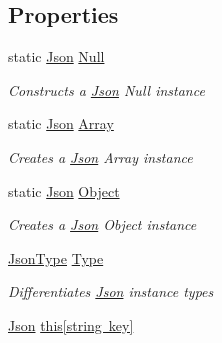 \subsection*{Properties}
\begin{DoxyCompactItemize}
\item 
static \mbox{\hyperlink{class_eagle_eye_1_1_models_1_1_json}{Json}} \mbox{\hyperlink{class_eagle_eye_1_1_models_1_1_json_a5a747d9202e52fdcfba6fd6cc821d5f0}{Null}}
\begin{DoxyCompactList}\small\item\em Constructs a \mbox{\hyperlink{class_eagle_eye_1_1_models_1_1_json}{Json}} Null instance \end{DoxyCompactList}\item 
static \mbox{\hyperlink{class_eagle_eye_1_1_models_1_1_json}{Json}} \mbox{\hyperlink{class_eagle_eye_1_1_models_1_1_json_a35e8187d23b3971fe9064b643fe66a5a}{Array}}
\begin{DoxyCompactList}\small\item\em Creates a \mbox{\hyperlink{class_eagle_eye_1_1_models_1_1_json}{Json}} Array instance \end{DoxyCompactList}\item 
static \mbox{\hyperlink{class_eagle_eye_1_1_models_1_1_json}{Json}} \mbox{\hyperlink{class_eagle_eye_1_1_models_1_1_json_a2196bd75222570b3e481efc887c28bf5}{Object}}
\begin{DoxyCompactList}\small\item\em Creates a \mbox{\hyperlink{class_eagle_eye_1_1_models_1_1_json}{Json}} Object instance \end{DoxyCompactList}\item 
\mbox{\hyperlink{class_eagle_eye_1_1_models_1_1_json_afdf0e16163f8b9bab5b45d6d01e8133c}{Json\+Type}} \mbox{\hyperlink{class_eagle_eye_1_1_models_1_1_json_a8b9b9f8ed1df50c3d00d2bd7cbbd9e46}{Type}}
\begin{DoxyCompactList}\small\item\em Differentiates \mbox{\hyperlink{class_eagle_eye_1_1_models_1_1_json}{Json}} instance types \end{DoxyCompactList}\item 
\mbox{\hyperlink{class_eagle_eye_1_1_models_1_1_json}{Json}} \mbox{\hyperlink{class_eagle_eye_1_1_models_1_1_json_a5406f24d73c683b7cfd14fcc16e1292b}{this\mbox{[}string key\mbox{]}}}

\end{DoxyCompactItemize}
